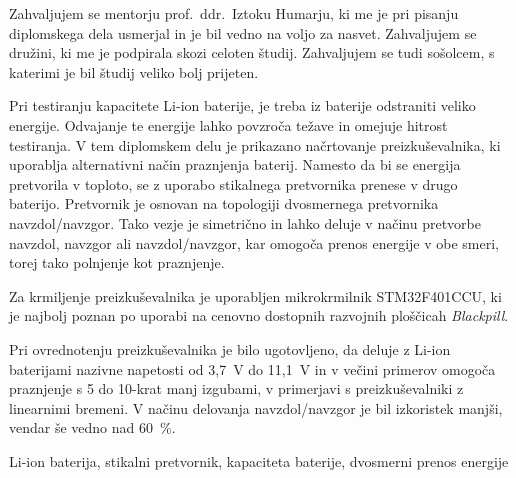 \documentclass[a4paper,twoside,openright,12pt,slovene]{book}
\date{Ljubljana, \the\year}
\newcommand{\srcpath}{res_dark}
\newcommand{\srcpath}{res}
\begin{document}
\frontmatter



\thispagestyle{empty}
\null\newpage

\thispagestyle{empty}
\null\newpage
\addtocounter{page}{-4}
\maketitle

\zahvala
Zahvaljujem se mentorju prof.\ ddr.\ Iztoku Humarju, ki me je pri pisanju diplomskega dela usmerjal in je bil vedno na voljo za nasvet.
Zahvaljujem se družini, ki me je podpirala skozi celoten študij.
Zahvaljujem se tudi sošolcem, s katerimi je bil študij veliko bolj prijeten.

\povzetek
Pri testiranju kapacitete Li-ion baterije, je treba iz baterije odstraniti veliko energije.
Odvajanje te energije lahko povzroča težave in omejuje hitrost testiranja.
V tem diplomskem delu je prikazano načrtovanje preizkuševalnika, ki uporablja alternativni način praznjenja baterij.
Namesto da bi se energija pretvorila v toploto, se z uporabo stikalnega pretvornika prenese v drugo baterijo.
Pretvornik je osnovan na topologiji dvosmernega pretvornika navzdol/navzgor.
Tako vezje je simetrično in lahko deluje v načinu pretvorbe navzdol, navzgor ali navzdol/navzgor,
kar omogoča prenos energije v obe smeri, torej tako polnjenje kot praznjenje.

Za krmiljenje preizkuševalnika je uporabljen mikrokrmilnik STM32F401CCU,
ki je najbolj poznan po uporabi na cenovno dostopnih razvojnih ploščicah \textit{Blackpill}.

Pri ovrednotenju preizkuševalnika je bilo ugotovljeno, da deluje z Li-ion baterijami nazivne napetosti od 3,7~V do 11,1~V
in v večini primerov omogoča praznjenje s 5 do 10-krat manj izgubami, v primerjavi s preizkuševalniki z linearnimi bremeni.
V načinu delovanja navzdol/navzgor je bil izkoristek manjši, vendar še vedno nad 60~\%.

\kljucnebesede
Li-ion baterija, stikalni pretvornik, kapaciteta baterije, dvosmerni prenos energije

\end{document}
